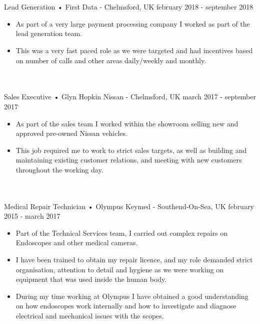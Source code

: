 \begin{projects}
	\\
  \\


	\wideexperience
	{Lead Generation • First Data - Chelmsford, UK}
	{february 2018 - september 2018}
	{\begin{itemize}
    \item As part of a very large payment processing company I worked as
      part of the lead generation team.
    \item This was a very fast paced role as we were targeted and had
      incentives based on number of calls and other areas daily/weekly
      and monthly.
  \end{itemize}}

	\\
  \\


	\wideexperience
	{Sales Executive • Glyn Hopkin Nissan - Chelmsford, UK}
	{march 2017 - september 2017}
	{\begin{itemize}
    \item As part of the sales team I worked within the showroom selling new
      and approved pre-owned Nissan vehicles.
    \item This job required me to work to strict sales targets, as well as
      building and maintaining existing customer relations, and meeting
      with new customers throughout the working day.
  \end{itemize}}

\\
\\


  \wideexperience
  {Medical Repair Technician • Olympus Keymed - Southend-On-Sea, UK}
  {february 2015 - march 2017}
  {\begin{itemize}
    \item Part of the Technical Services team, I carried out complex repairs
      on Endoscopes and other medical cameras.
    \item I have been trained to obtain my repair licence, and my role
      demanded strict organisation, attention to detail and hygiene as we
      were working on equipment that was used inside the human body.
    \item During my time working at Olympus I have obtained a good
      understanding on how endoscopes work internally and how to
      investigate and diagnose electrical and mechanical issues with the
      scopes.
  \end{itemize}}

\end{projects}

